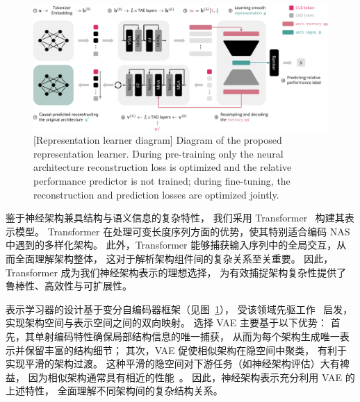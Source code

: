 \documentclass[../main.tex]{subfiles}
\begin{document}
\begin{figure}[t]
	\centering
	\includegraphics[width=\linewidth]{BRIDGE/repr-learner.pdf}
	[Representation learner diagram]{
		Diagram of the proposed representation learner.
		During pre-training only the neural architecture reconstruction loss is optimized and the relative performance predictor is not trained;
		during fine-tuning, the reconstruction and prediction losses are optimized jointly.
	}\label{fig:repr-learner}
\end{figure}

\label{sec:ch4-5-2-transformer-based-variational-autoencoder}

鉴于神经架构兼具结构与语义信息的复杂特性，
我们采用 Transformer~\cite{attentionisall_vaswani_2017,narformerneural_yi_2023} 构建其表示模型。
Transformer 在处理可变长度序列方面的优势，使其特别适合编码 NAS 中遇到的多样化架构。
此外，Transformer 能够捕获输入序列中的全局交互，从而全面理解架构整体，
这对于解析架构组件间的复杂关系至关重要。
因此，Transformer 成为我们神经架构表示的理想选择，
为有效捕捉架构复杂性提供了鲁棒性、高效性与可扩展性。

表示学习器的设计基于变分自编码器框架（见图~\ref{fig:repr-learner}），
受该领域先驱工作~\cite{doesunsupervisedarchitecture_yan_2020,smoothvariationalgraph_lukasik_2021} 启发，
实现架构空间与表示空间之间的双向映射。
选择 VAE 主要基于以下优势：
首先，其单射编码特性确保局部结构信息的唯一捕获，
从而为每个架构生成唯一表示并保留丰富的结构细节；
其次，VAE 促使相似架构在隐空间中聚类，
有利于实现平滑的架构过渡。
这种平滑的隐空间对下游任务（如神经架构评估）大有裨益，
因为相似架构通常具有相近的性能~\cite{surveyevolutionaryneural_liu_2020}。
因此，神经架构表示充分利用 VAE 的上述特性，
全面理解不同架构间的复杂结构关系。
\end{document}
